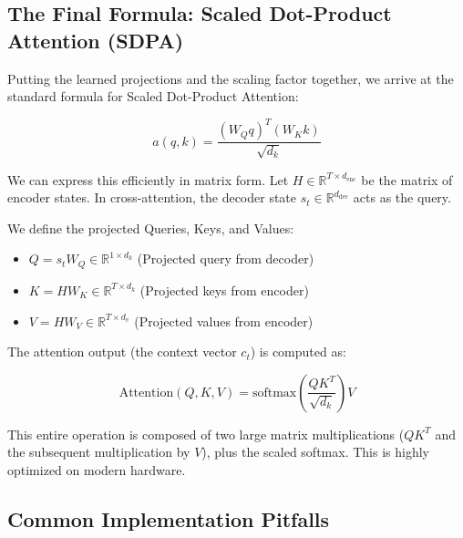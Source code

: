\documentclass{article}
\begin{document}
\subsection{The Final Formula: Scaled Dot-Product Attention (SDPA)}

Putting the learned projections and the scaling factor together, we arrive at the standard formula for Scaled Dot-Product Attention:

\begin{equation}
a(q, k) = \frac{(W_Q q)^T (W_K k)}{\sqrt{d_k}}
\end{equation}

We can express this efficiently in matrix form. Let $H\in\mathbb{R}^{T\times d_{\text{enc}}}$ be the matrix of encoder states. In cross-attention, the decoder state $s_t\in\mathbb{R}^{d_{\text{dec}}}$ acts as the query.

We define the projected Queries, Keys, and Values:
\begin{itemize}
\item $Q = s_t W_Q \in \mathbb{R}^{1\times d_k}$ (Projected query from decoder)
\item $K = HW_K \in \mathbb{R}^{T\times d_k}$ (Projected keys from encoder)
\item $V = HW_V \in \mathbb{R}^{T\times d_v}$ (Projected values from encoder)
\end{itemize}

The attention output (the context vector $c_t$) is computed as:

\begin{equation}
\text{Attention}(Q, K, V) = \text{softmax}\left(\frac{QK^T}{\sqrt{d_k}}\right)V
\end{equation}

This entire operation is composed of two large matrix multiplications ($QK^T$ and the subsequent multiplication by $V$), plus the scaled softmax. This is highly optimized on modern hardware.

\subsection{Common Implementation Pitfalls}
\end{document}
